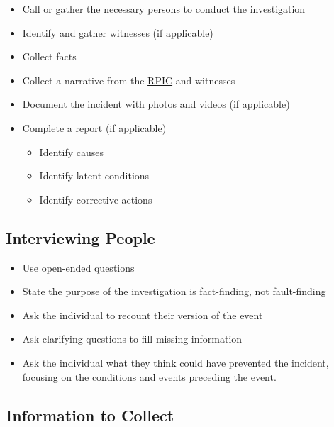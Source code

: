 \documentclass[
]{book}
\providecommand{\tightlist}{%
  \setlength{\itemsep}{0pt}\setlength{\parskip}{0pt}}
\begin{document}
\begin{itemize}
\item
  Call or gather the necessary persons to conduct the investigation
\item
  Identify and gather witnesses (if applicable)
\item
  Collect facts
\item
  Collect a narrative from the \protect\hyperlink{RPIC}{RPIC} and witnesses
\item
  Document the incident with photos and videos (if applicable)
\item
  Complete a report (if applicable)

  \begin{itemize}
  \tightlist
  \item
    Identify causes
  \item
    Identify latent conditions
  \item
    Identify corrective actions
  \end{itemize}
\end{itemize}

\hypertarget{interviewing-people}{%
\subsection{Interviewing People}\label{interviewing-people}}

\begin{itemize}
\tightlist
\item
  Use open-ended questions
\item
  State the purpose of the investigation is fact-finding, not fault-finding
\item
  Ask the individual to recount their version of the event
\item
  Ask clarifying questions to fill missing information
\item
  Ask the individual what they think could have prevented the incident, focusing on the conditions and events preceding the event.
\end{itemize}

\hypertarget{information-to-collect}{%
\subsection{Information to Collect}\label{information-to-collect}}
\end{document}
